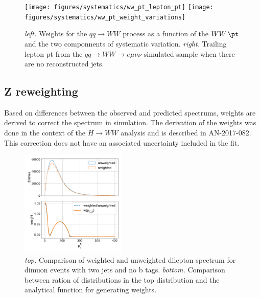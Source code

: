 \begin{figure}[h]
    \centering
    \texttt{[image: figures/systematics/ww\_pt\_lepton\_pt]}
    \texttt{[image: figures/systematics/ww\_pt\_weight\_variations]}
    \caption{\emph{left.} Weights for the $qq\rightarrow WW$ process as
        a function of the $WW\,\pt$ and the two componnents of
        systematic variation.  \emph{right.} Trailing lepton pt from the $qq\rightarrow
        WW\rightarrow e\mu\nu\nu$ simulated sample when there are no
        reconstructed jets.
        \label{fig:ww_weight}
    } 
\end{figure}

\subsection{Z \pt reweighting}

Based on differences between the observed and predicted \PZ \pt
spectrums, weights are derived to correct the \pt spectrum in
simulation.  The derivation of the weights was done in the context of
the $H\rightarrow WW$ analysis and is described in AN-2017-082.  This
correction does not have an associated uncertainty included in the fit.

\begin{figure}[h]
    \centering
    \includegraphics[width=0.45\textwidth]{figures/z_pt_weighting}
    \caption{\emph{top.} Comparison of weighted and unweighted dilepton
        \pt spectrum for dimuon events with two jets and no b tags.
        \emph{bottom.} Comparison between ration of distributions in the
        top distribution and the analytical function for generating
        weights.
        \label{fig:ww_weight}
    } 
\end{figure}
